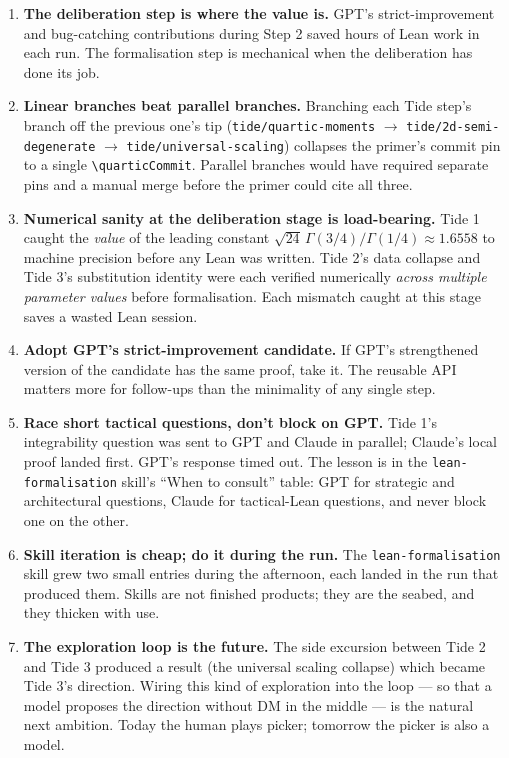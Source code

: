 \documentclass[11pt]{article}
\begin{document}
\begin{enumerate}
\item \textbf{The deliberation step is where the value is.} GPT's
strict-improvement and bug-catching contributions during Step 2 saved
hours of Lean work in each run. The formalisation step is mechanical
when the deliberation has done its job.

\item \textbf{Linear branches beat parallel branches.} Branching each
Tide step's branch off the previous one's tip (\texttt{tide/quartic-moments}
$\to$ \texttt{tide/2d-semi-degenerate} $\to$ \texttt{tide/universal-scaling})
collapses the primer's commit pin to a single
\texttt{\textbackslash quarticCommit}. Parallel branches would have
required separate pins and a manual merge before the primer could
cite all three.

\item \textbf{Numerical sanity at the deliberation stage is
load-bearing.} Tide 1 caught the \emph{value} of the leading constant
$\sqrt{24}\,\Gamma(3/4)/\Gamma(1/4) \approx 1.6558$ to machine
precision before any Lean was written. Tide 2's data collapse and
Tide 3's substitution identity were each verified numerically
\emph{across multiple parameter values} before formalisation. Each
mismatch caught at this stage saves a wasted Lean session.

\item \textbf{Adopt GPT's strict-improvement candidate.} If GPT's
strengthened version of the candidate has the same proof, take it.
The reusable API matters more for follow-ups than the minimality of
any single step.

\item \textbf{Race short tactical questions, don't block on GPT.}
Tide 1's integrability question was sent to GPT and Claude in
parallel; Claude's local proof landed first. GPT's response timed out.
The lesson is in the \texttt{lean-formalisation} skill's ``When to
consult'' table: GPT for strategic and architectural questions, Claude
for tactical-Lean questions, and never block one on the other.

\item \textbf{Skill iteration is cheap; do it during the run.} The
\texttt{lean-formalisation} skill grew two small entries during the
afternoon, each landed in the run that produced them. Skills are not
finished products; they are the seabed, and they thicken with use.

\item \textbf{The exploration loop is the future.} The side excursion
between Tide 2 and Tide 3 produced a result (the universal scaling
collapse) which became Tide 3's direction. Wiring this kind of
exploration into the loop --- so that a model proposes the direction
without DM in the middle --- is the natural next ambition. Today the
human plays picker; tomorrow the picker is also a model.
\end{enumerate}
\end{document}
